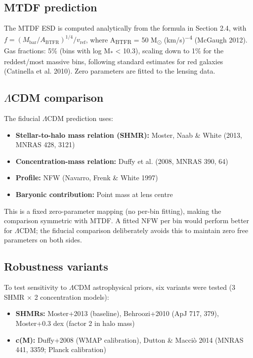 \documentclass[11pt,a4paper]{article}
\begin{document}
\subsection{MTDF prediction}
The MTDF ESD is computed analytically from the formula in Section 2.4, with \(f = (M_{\mathrm{bar}} / A_{\mathrm{BTFR}})^{1/4} / v_{\mathrm{ref}}\), where A\textsubscript{BTFR} = 50 M\textsubscript{$\odot$} (km/\allowbreak{}s)\textsuperscript{$-$4} (McGaugh 2012). Gas fractions: 5\% (bins with log M\textsubscript{*} < 10.3), scaling down to 1\% for the reddest/\allowbreak{}most massive bins, following standard estimates for red galaxies (Catinella et al. 2010). Zero parameters are fitted to the lensing data.

\subsection{$\Lambda$CDM comparison}
The fiducial $\Lambda$CDM prediction uses:

\begin{itemize}
  \item \textbf{Stellar-to-halo mass relation (SHMR):} Moster, Naab \& White (2013, MNRAS 428, 3121)
  \item \textbf{Concentration-mass relation:} Duffy et al. (2008, MNRAS 390, 64)
  \item \textbf{Profile:} NFW (Navarro, Frenk \& White 1997)
  \item \textbf{Baryonic contribution:} Point mass at lens centre
\end{itemize}

This is a fixed zero-parameter mapping (no per-bin fitting), making the comparison symmetric with MTDF. A fitted NFW per bin would perform better for $\Lambda$CDM; the fiducial comparison deliberately avoids this to maintain zero free parameters on both sides.

\subsection{Robustness variants}
To test sensitivity to $\Lambda$CDM astrophysical priors, six variants were tested (3 SHMR $\times$ 2 concentration models):

\begin{itemize}
  \item \textbf{SHMRs:} Moster+2013 (baseline), Behroozi+2010 (ApJ 717, 379), Moster+0.3 dex (factor 2 in halo mass)
  \item \textbf{c(M):} Duffy+2008 (WMAP calibration), Dutton \& Macci\`o 2014 (MNRAS 441, 3359; Planck calibration)
\end{itemize}
\end{document}
